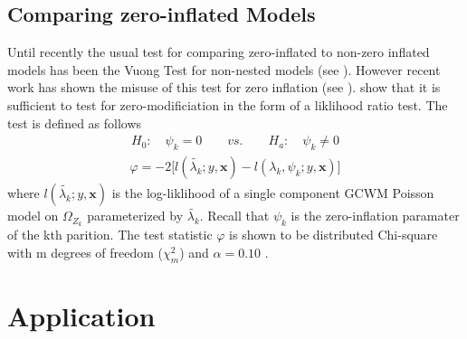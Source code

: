 \documentclass[11pt,letterpaper]{article}
\numberwithin{equation}{section}
\numberwithin{equation}{section}
\numberwithin{equation}{section}
\begin{document}
\subsection{Comparing zero-inflated Models}

Until recently the usual test for comparing zero-inflated to non-zero inflated models has been the Vuong Test for non-nested models (see \cite{vuongTest}). However recent work has shown the misuse of this test for zero inflation (see \cite{misuse}). \cite{newIntuitive} show that it is sufficient to test for zero-modificiation in the form of a liklihood ratio test. The test is defined as follows
\begin{align*}
& & H_0: \quad \psi_k = 0 \quad\quad vs. \quad\quad H_a: \quad \psi_k \neq 0  & & 
\end{align*}
\begin{align*}
\varphi = -2 \bigg[l(\tilde{\lambda_k}; y, \bm{x}) - l(\lambda_k, \psi_k; y , \bm{x} )\bigg] 
\end{align*}
where $l(\tilde{\lambda_k}; y , \bm{x})$ is the log-liklihood of a single component GCWM Poisson model on $\Omega_{Z_k}$ parameterized by $\tilde{\lambda_k}$. Recall that $\psi_k$ is the zero-inflation paramater of the kth parition. The test statistic $\varphi$ is shown to be distributed Chi-square with m degrees of freedom ($\chi^2_m $) and $\alpha = 0.10$ \citep{newIntuitive}.   

\section{Application}
\end{document}
